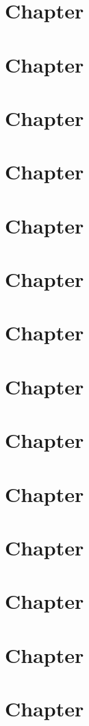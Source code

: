 \documentclass[a4paper,10pt]{book}
\begin{document}
\chapter{Chapter}\label{Chap1}
\chapter{Chapter}\label{Chap2}
\chapter{Chapter}\label{Chap3}
\chapter{Chapter}\label{Chap4}
\chapter{Chapter}\label{Chap5}
\chapter{Chapter}\label{Chap6}
\chapter{Chapter}\label{Chap7}
\chapter{Chapter}\label{Chap8}
\chapter{Chapter}\label{Chap9}
\chapter{Chapter}\label{Chap10}
\chapter{Chapter}\label{Chap11}
\chapter{Chapter}\label{Chap12}
\chapter{Chapter}\label{Chap13}
\chapter{Chapter}\label{Chap14}
\end{document}
